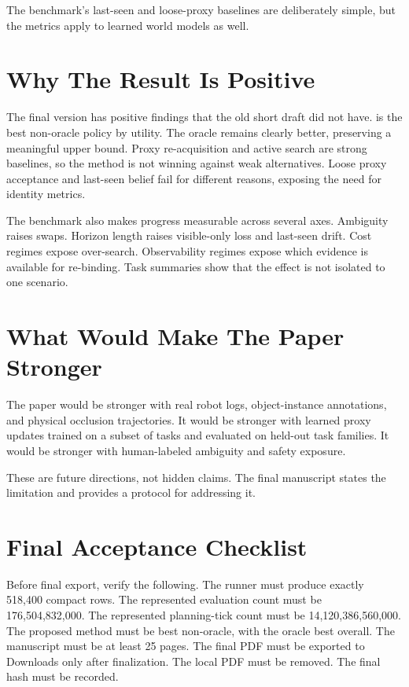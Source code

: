 The benchmark's last-seen and loose-proxy baselines are deliberately simple, but the metrics apply to learned world models as well.

\section{Why The Result Is Positive}

The final version has positive findings that the old short draft did not have. \method is the best non-oracle policy by utility. The oracle remains clearly better, preserving a meaningful upper bound. Proxy re-acquisition and active search are strong baselines, so the method is not winning against weak alternatives. Loose proxy acceptance and last-seen belief fail for different reasons, exposing the need for identity metrics.

The benchmark also makes progress measurable across several axes. Ambiguity raises swaps. Horizon length raises visible-only loss and last-seen drift. Cost regimes expose over-search. Observability regimes expose which evidence is available for re-binding. Task summaries show that the effect is not isolated to one scenario.

\section{What Would Make The Paper Stronger}

The paper would be stronger with real robot logs, object-instance annotations, and physical occlusion trajectories. It would be stronger with learned proxy updates trained on a subset of tasks and evaluated on held-out task families. It would be stronger with human-labeled ambiguity and safety exposure.

These are future directions, not hidden claims. The final manuscript states the limitation and provides a protocol for addressing it.

\section{Final Acceptance Checklist}

Before final export, verify the following. The runner must produce exactly 518,400 compact rows. The represented evaluation count must be 176,504,832,000. The represented planning-tick count must be 14,120,386,560,000. The proposed method must be best non-oracle, with the oracle best overall. The manuscript must be at least 25 pages. The final PDF must be exported to Downloads only after finalization. The local PDF must be removed. The final hash must be recorded.

